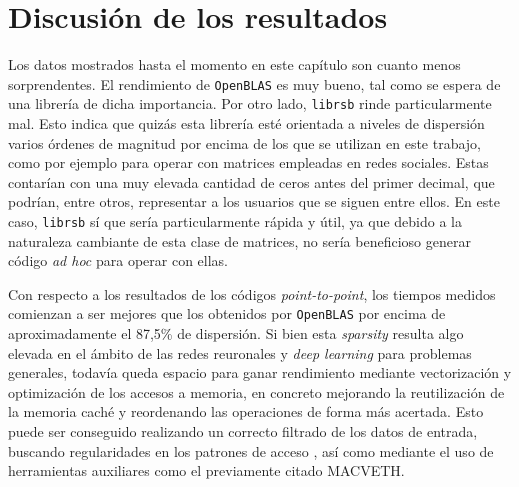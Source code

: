\section{Discusión de los resultados}
Los datos mostrados hasta el momento en este capítulo son cuanto menos sorprendentes. El rendimiento de \texttt{OpenBLAS} es muy bueno, tal como se espera de una librería de dicha importancia. Por otro lado, \texttt{librsb} rinde particularmente mal. Esto indica que quizás esta librería esté orientada a niveles de dispersión varios órdenes de magnitud por encima de los que se utilizan en este trabajo, como por ejemplo para operar con matrices empleadas en redes sociales. Estas contarían con una muy elevada cantidad de ceros antes del primer decimal, que podrían, entre otros, representar a los usuarios que se siguen entre ellos. En este caso, \texttt{librsb} sí que sería particularmente rápida y útil, ya que debido a la naturaleza cambiante de esta clase de matrices, no sería beneficioso generar código \textit{ad hoc} para operar con ellas.

Con respecto a los resultados de los códigos \textit{point-to-point}, los tiempos medidos comienzan a ser mejores que los obtenidos por \texttt{OpenBLAS} por encima de aproximadamente el 87,5\% de dispersión. Si bien esta \textit{sparsity} resulta algo elevada en el ámbito de las redes reuronales y \textit{deep learning} para problemas generales, todavía queda espacio para ganar rendimiento mediante vectorización y optimización de los accesos a memoria, en concreto mejorando la reutilización de la memoria caché y reordenando las operaciones de forma más acertada. Esto puede ser conseguido realizando un correcto filtrado de los datos de entrada, buscando regularidades en los patrones de acceso \cite{piecewise_10.1145/3314221.3314615}, así como mediante el uso de herramientas auxiliares como el previamente citado MACVETH.
